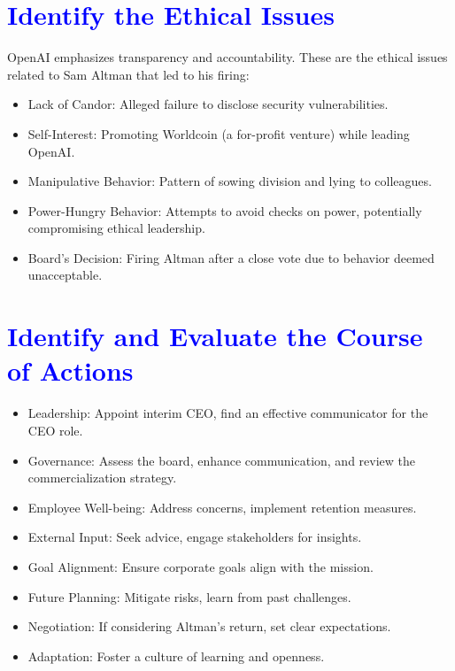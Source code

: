 \documentclass{article}
\begin{document}
\section{\textcolor{blue}{Identify the Ethical Issues}}
OpenAI emphasizes transparency and accountability. These are the ethical issues related to Sam Altman that led to his firing:
\begin{itemize}
    \item Lack of Candor: Alleged failure to disclose security vulnerabilities.
    \item Self-Interest: Promoting Worldcoin (a for-profit venture) while leading OpenAI.
    \item Manipulative Behavior: Pattern of sowing division and lying to colleagues.
    \item Power-Hungry Behavior: Attempts to avoid checks on power, potentially compromising ethical leadership.
    \item Board's Decision: Firing Altman after a close vote due to behavior deemed unacceptable.
\end{itemize}

\section{\textcolor{blue}{Identify and Evaluate the Course of Actions}}
\begin{itemize}
    \item Leadership: Appoint interim CEO, find an effective communicator for the CEO role.
    \item Governance: Assess the board, enhance communication, and review the commercialization strategy.
    \item Employee Well-being: Address concerns, implement retention measures.
    \item External Input: Seek advice, engage stakeholders for insights.
    \item Goal Alignment: Ensure corporate goals align with the mission.
    \item Future Planning: Mitigate risks, learn from past challenges.
    \item Negotiation: If considering Altman's return, set clear expectations.
    \item Adaptation: Foster a culture of learning and openness.
\end{itemize}
\end{document}
